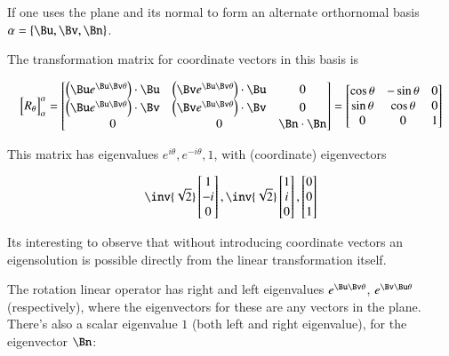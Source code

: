If one uses the plane and its normal to form an alternate orthornomal basis 
$\alpha = \{\Bu, \Bv, \Bn\}$.

The transformation matrix for coordinate vectors in this basis is

\[
{
\begin{bmatrix}
R_\theta
\end{bmatrix}
}_\alpha^\alpha
=
\begin{bmatrix}
\left(\Bu e^{\Bu\Bv \theta}\right) \cdot \Bu & \left(\Bv e^{\Bu\Bv \theta}\right) \cdot \Bu & 0 \\
\left(\Bu e^{\Bu\Bv \theta}\right) \cdot \Bv & \left(\Bv e^{\Bu\Bv \theta}\right) \cdot \Bv & 0 \\
0 & 0 & \Bn\cdot\Bn \\
\end{bmatrix}
=
\begin{bmatrix}
\cos\theta & -\sin\theta & 0 \\
\sin\theta & \cos\theta & 0 \\
0 & 0 & 1 \\
\end{bmatrix}
\]

This matrix has eigenvalues $e^{i\theta}, e^{-i\theta}, 1$, with (coordinate) eigenvectors

\[
\inv{\sqrt{2}}
\begin{bmatrix}
1 \\
-i \\
0 \\
\end{bmatrix},
\inv{\sqrt{2}}
\begin{bmatrix}
1 \\
i \\
0 \\
\end{bmatrix},
\begin{bmatrix}
0 \\
0 \\
1 \\
\end{bmatrix}
\]

Its interesting to observe that without introducing coordinate vectors an eigensolution is possible directly from
the linear transformation itself.

The rotation linear operator has right and left eigenvalues $e^{\Bu\Bv \theta}$, $e^{\Bv\Bu \theta}$ (respectively), where the eigenvectors for these are any vectors in the plane.  There's also a scalar eigenvalue $1$ (both left and right eigenvalue), for the eigenvector $\Bn$:

